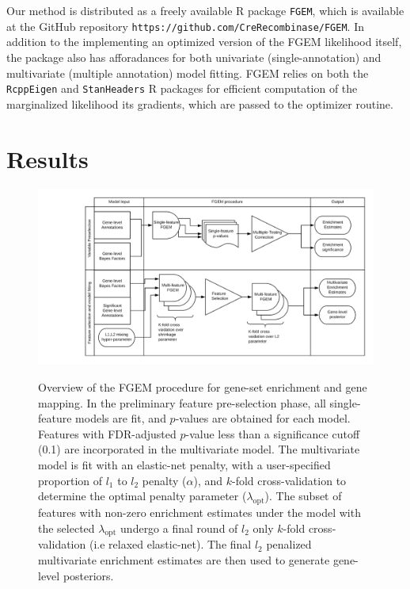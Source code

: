 Our method is distributed as a freely available R package \cite{Rlang} \texttt{FGEM}, which is available at the GitHub repository \texttt{https://github.com/CreRecombinase/FGEM}.  In addition to the implementing an optimized version of the FGEM likelihood itself, the package also has afforadances for both univariate (single-annotation) and multivariate (multiple annotation) model fitting.  FGEM relies on both the \texttt{RcppEigen} \cite{RcppEigen} and  \texttt{StanHeaders} R packages for efficient computation of the marginalized likelihood its gradients, which are passed to the optimizer routine.  


\section{Results}\label{sec:org6fb4837}

\begin{figure}[h]
  \centering
  \includegraphics[width=.9\linewidth]{img/FGEM_procedure.png}\label{fig:overview}
  \caption{Overview of the FGEM procedure for gene-set enrichment and gene mapping.  In the preliminary feature pre-selection phase, all single-feature models are fit, and $p$-values are obtained for each model.
    Features with FDR-adjusted $p$-value less than a significance cutoff (0.1) are incorporated in the multivariate model. The multivariate model is fit with an elastic-net penalty, with a user-specified proportion of $l_1$
    to $l_2$ penalty ($\alpha$), and $k$-fold cross-validation to determine the optimal penalty parameter ($\lambda_{\text{opt}}$).  The subset of features with non-zero enrichment estimates under the model with the selected $\lambda_{\text{opt}}$ undergo a final round of $l_2$ only $k$-fold cross-validation (i.e relaxed elastic-net).  The final $l_2$ penalized multivariate enrichment estimates are then used to generate gene-level posteriors. }
\end{figure}


